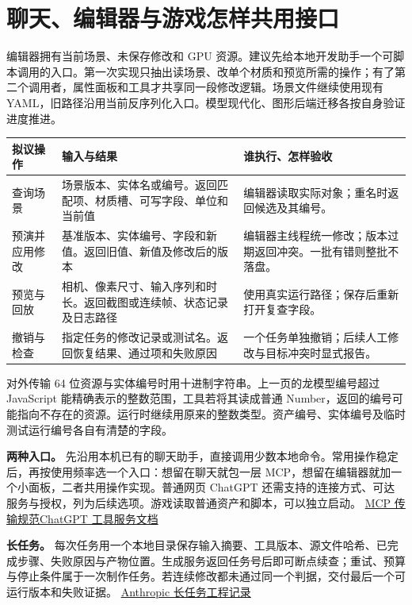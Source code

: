 \documentclass[UTF8,11pt,fontset=fandol,a4paper]{ctexart}
\newcommand{\src}[2]{\href{#1}{#2}}
\newcommand{\pg}[1]{\clearpage\section{#1}}
\begin{document}
\pg{聊天、编辑器与游戏怎样共用接口}
编辑器拥有当前场景、未保存修改和 GPU 资源。建议先给本地开发助手一个可脚本调用的入口。第一次实现只抽出读场景、改单个材质和预览所需的操作；有了第二个调用者，属性面板和工具才共享同一段修改逻辑。场景文件继续使用现有 YAML，旧路径沿用当前反序列化入口。模型现代化、图形后端迁移各按自身验证进度推进。

\begin{center}\small
\begin{tabularx}{\linewidth}{@{}p{31mm}XX@{}}\toprule
拟议操作 & 输入与结果 & 谁执行、怎样验收\\\midrule
查询场景 & 场景版本、实体名或编号。返回匹配项、材质槽、可写字段、单位和当前值 & 编辑器读取实际对象；重名时返回候选及其编号。\\
预演并应用修改 & 基准版本、实体编号、字段和新值。返回旧值、新值及修改后的版本 & 编辑器主线程统一修改；版本过期返回冲突。一批有错则整批不落盘。\\
预览与回放 & 相机、像素尺寸、输入序列和时长。返回截图或连续帧、状态记录及日志路径 & 使用真实运行路径；保存后重新打开复查字段。\\
撤销与检查 & 指定任务的修改记录或测试名。返回恢复结果、通过项和失败原因 & 一个任务单独撤销；后续人工修改与目标冲突时显式报告。\\
\bottomrule\end{tabularx}\end{center}

对外传输 64 位资源与实体编号时用十进制字符串。上一页的龙模型编号超过 JavaScript 能精确表示的整数范围，工具若将其读成普通 Number，返回的编号可能指向不存在的资源。运行时继续用原来的整数类型。资产编号、实体编号及临时测试运行编号各自有清楚的字段。

\textbf{两种入口。} 先沿用本机已有的聊天助手，直接调用少数本地命令。常用操作稳定后，再按使用频率选一个入口：想留在聊天就包一层 MCP，想留在编辑器就加一个小面板，二者共用操作实现。普通网页 ChatGPT 还需支持的连接方式、可达服务与授权，列为后续选项。游戏读取普通资产和脚本，可以独立启动。 \src{https://modelcontextprotocol.io/specification/2025-11-25/basic/transports}{MCP 传输规范}\quad \src{https://developers.openai.com/plugins/concepts/mcp-server}{ChatGPT 工具服务文档}

\textbf{长任务。} 每次任务用一个本地目录保存输入摘要、工具版本、源文件哈希、已完成步骤、失败原因与产物位置。生成服务返回任务号后即可断点续查；重试、预算与停止条件属于一次制作任务。若连续修改都未通过同一个判据，交付最后一个可运行版本和失败证据。 \src{https://www.anthropic.com/research/effective-harnesses-for-long-running-agents}{Anthropic 长任务工程记录}
\end{document}
